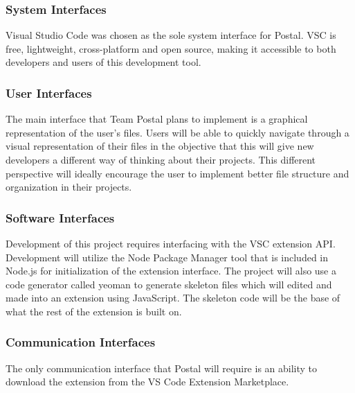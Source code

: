 \documentclass[letterpaper,10pt,titlepage,draftclsnofoot,onecolumn,onesided] {IEEEtran}
\begin{document}
\subsubsection{System Interfaces}
Visual Studio Code was chosen as the sole system interface for Postal.
VSC is free, lightweight, cross-platform and open source, making it accessible to both developers and users of this development tool.

\subsubsection{User Interfaces}
The main interface that Team Postal plans to implement is a graphical representation of the user's files. 
Users will be able to quickly navigate through a visual representation of their files in the objective that this will give new developers a different way of thinking about their projects.
This different perspective will ideally encourage the user to implement better file structure and organization in their projects.

\subsubsection{Software Interfaces}
Development of this project requires interfacing with the VSC extension API. Development will utilize the Node Package Manager tool that is included in Node.js for initialization of the extension interface. The project will also use a code generator called yeoman to generate skeleton files which will edited and made into an extension using JavaScript. The skeleton code will be the base of what the rest of the extension is built on.

\subsubsection{Communication Interfaces}
The only communication interface that Postal will require is an ability to download the extension from the VS Code Extension Marketplace.
\end{document}
